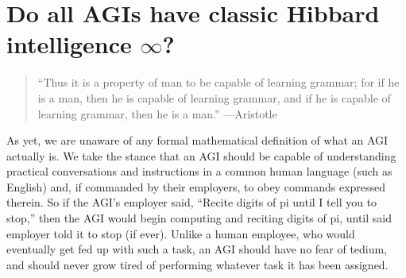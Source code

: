 \documentclass{article}
\begin{document}
\section{Do all AGIs have classic Hibbard intelligence $\infty$?}
\label{agiperspectivesection}

\begin{quote}
    ``Thus it is a property of man to be capable of learning
    grammar; for if he is a man, then he is capable of learning
    grammar, and if he is capable of learning grammar, then he is
    a man.'' ---Aristotle \cite{aristotle}
\end{quote}

As yet, we are unaware of any formal mathematical definition of what an AGI
actually is. We take the stance that an AGI should be capable of understanding
practical conversations and instructions in a common human language (such as
English) and, if commanded by their employers, to obey commands expressed
therein. So if the AGI's employer said, ``Recite digits of pi until I tell you to
stop,'' then the AGI would begin computing and reciting digits of pi, until said
employer told it to stop (if ever). Unlike a human employee, who would eventually
get fed up with such a task, an AGI should have no fear of tedium, and should
never grow tired of performing whatever task it has been assigned.
\end{document}
